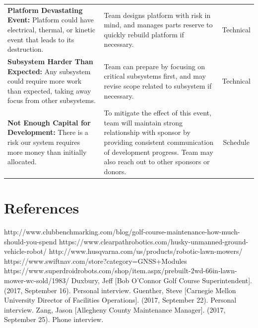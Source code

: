 \documentclass[12pt]{extarticle}
\begin{document}
\begin{table}[H]
\begin{tabular}{p{7cm}p{6cm}c}
\textbf{Platform Devastating Event:} 
Platform could have electrical, thermal, or kinetic event that leads to its destruction.
&
Team designs platform with risk in mind, and manages parts reserve to quickly rebuild platform if necessary.
&
Technical\\

\textbf{Subsystem Harder Than Expected:} 
Any subsystem could require more work than expected, taking away focus from other subsystems.
&
Team can prepare by focusing on critical subsystems first, and may revise scope related to subsystem if necessary.
&
Technical\\

\textbf{Not Enough Capital for Development:} 
There is a risk our system requires more money than initially allocated.
&
To mitigate the effect of this event, team will maintain strong relationship with sponsor by providing consistent communication of development progress. Team may also reach out to other sponsors or donors.
&
Schedule\\
\end{tabular}
\end{table}

\begingroup
\newpage
\section{References}
\renewcommand{\section}[2]{}%
\begin{thebibliography}{}
http://www.clubbenchmarking.com/blog/golf-course-maintenance-how-much-should-you-spend
https://www.clearpathrobotics.com/husky-unmanned-ground-vehicle-robot/
http://www.husqvarna.com/us/products/robotic-lawn-mowers/
https://www.swiftnav.com/store?category=GNSS+Modules
https://www.superdroidrobots.com/shop/item.aspx/prebuilt-2wd-66in-lawn-mower-wc-sold/1983/
Duxbury, Jeff [Bob O’Connor Golf Course Superintendent]. (2017, September 16). Personal interview.
Guenther, Steve [Carnegie Mellon University Director of Facilities Operations]. (2017, September 22). Personal interview.
Zang, Jason [Allegheny County Maintenance Manager]. (2017, September 25). Phone interview.
\end{thebibliography}
\endgroup
\end{document}
